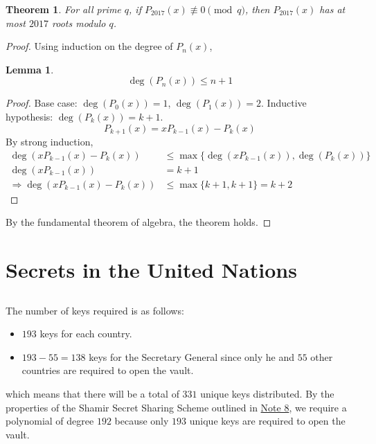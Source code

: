 \documentclass{article}
\newtheorem{theorem}{Theorem}
\newtheorem{lemma}{Lemma}
\begin{document}
\begin{theorem}
    For all prime \(q\), if \(P_{2017}(x) \not\equiv 0 \pmod{q}\), then \(P_{2017}(x)\) has at most \(2017\) roots modulo \(q\).
\end{theorem}
\begin{proof}
    Using induction on the degree of \(P_n(x)\),
    \begin{lemma}
        \begin{equation}
            \deg(P_n(x)) \leqslant n + 1
        \end{equation}
    \end{lemma}
    \begin{proof}
        Base case: \(\deg(P_0(x)) = 1\), \(\deg(P_1(x)) = 2\).
        Inductive hypothesis: \(\deg(P_k(x)) = k + 1\).
        \begin{equation}
            P_{k + 1}(x) = x P_{k - 1}(x) - P_k(x)
        \end{equation}
        By strong induction,
        \begin{align}
            \deg(x P_{k - 1}(x) - P_k(x)) &\leqslant \max\{\deg(x P_{k - 1}(x)), \deg(P_k(x))\} \\
            \deg(x P_{k - 1}(x)) &= k + 1 \\
            \Rightarrow \deg(x P_{k - 1}(x) - P_k(x)) &\leqslant \max\{k + 1, k + 1\} = k + 2
        \end{align}
    \end{proof}
    By the fundamental theorem of algebra, the theorem holds.
\end{proof}

\section{Secrets in the United Nations}

\subsection{}

The number of keys required is as follows:
\begin{itemize}
    \item \(193\) keys for each country.
    \item \(193 - 55 = 138\) keys for the Secretary General since only he and \(55\) other countries are required to open the vault.
\end{itemize}
which means that there will be a total of \(331\) unique keys distributed.
By the properties of the Shamir Secret Sharing Scheme outlined in \href{https://www.eecs70.org/static/notes/n8.pdf}{Note 8}, we require a polynomial of degree \(192\) because only \(193\) unique keys are required to open the vault.
\end{document}

